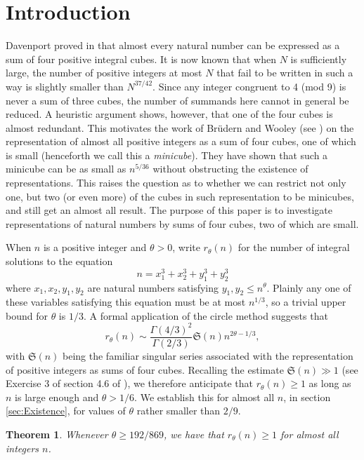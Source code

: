 \documentclass[12pt,english,reqno]{amsart}
\theoremstyle{definition}
\theoremstyle{remark}
\numberwithin{equation}{section}
\numberwithin{equation}{section}
\numberwithin{figure}{section}
\theoremstyle{plain}
\newtheorem{thm}{Theorem}[section]
\theoremstyle{plain}
\theoremstyle{plain}
\theoremstyle{plain}
\numberwithin{equation}{section}
\numberwithin{thm}{section}
\begin{document}
\section{Introduction}
\par Davenport proved in \cite{davenport1939} that almost every
natural number can be expressed as a sum of four positive integral
cubes. It is now known that when $N$ is sufficiently large, the number
of positive integers at most $N$ that fail to be written in such
a way is slightly smaller than $N^{37/42}$. Since any integer congruent
to 4 (mod 9) is never a sum of three cubes, the number of summands
here cannot in general be reduced. A heuristic argument shows, however,
that one of the four cubes is almost redundant. This motivates the
work of Br\"{u}dern and Wooley (see \cite{BrudernWooley2009}) on the
representation of almost all positive integers as a sum of four cubes,
one of which is small (henceforth we call this a \textit{minicube}).
They have shown that such a minicube can be as small as $n^{5/36}$
without obstructing the existence of representations. This raises
the question as to whether we can restrict not only one, but two (or
even more) of the cubes in such representation to be minicubes, and
still get an almost all result. The purpose of this paper is to investigate
representations of natural numbers by sums of four cubes, two of which
are small.
\par When $n$ is a positive integer and $\theta>0$, write $r_{\theta}(n)$
for the number of integral solutions to the equation
\begin{equation}
n=x_{1}^{3}+x_{2}^{3}+y_{1}^{3}+y_{2}^{3}\label{eq:r(n)}\end{equation}
where $x_{1},x_{2},y_{1},y_{2}$ are natural numbers satisfying $y_{1},y_{2}\leq n^{\theta}$.
Plainly any one of these variables satisfying this equation must be
at most $n^{1/3}$, so a trivial upper bound for $\theta$ is $1/3$.
A formal application of the circle method suggests that
\[
r_{\theta}(n)\sim\frac{\Gamma(4/3)^{2}}{\Gamma(2/3)}\mathfrak{S}(n)n^{2\theta-1/3},\]
with $\mathfrak{S}(n)$ being the familiar singular series associated
with the representation of positive integers as sums of four cubes.
Recalling the estimate $\mathfrak{S}(n)\gg1$ (see Exercise 3 of section
4.6 of \cite{vaughan1997}), we therefore anticipate that $r_{\theta}(n)\geq1$
as long as $n$ is large enough and $\theta>1/6$. We establish this
for almost all $n$, in section \ref{sec:Existence}, for values of
$\theta$ rather smaller than $2/9$.
\begin{thm}
\label{thm:existence}Whenever $\theta\geq192/869$, we have that
$r_{\theta}(n)\geq1$ for almost all integers $n$.
\end{thm}
\end{document}

